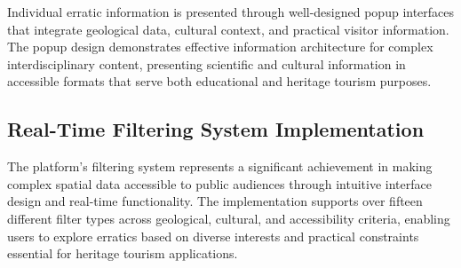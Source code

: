 
Individual erratic information is presented through well-designed popup interfaces that integrate geological data, cultural context, and practical visitor information. The popup design demonstrates effective information architecture for complex interdisciplinary content, presenting scientific and cultural information in accessible formats that serve both educational and heritage tourism purposes.


\subsection{Real-Time Filtering System Implementation}
\label{subsec_filtering_system_results}

The platform's filtering system represents a significant achievement in making complex spatial data accessible to public audiences through intuitive interface design and real-time functionality. The implementation supports over fifteen different filter types across geological, cultural, and accessibility criteria, enabling users to explore erratics based on diverse interests and practical constraints essential for heritage tourism applications.


